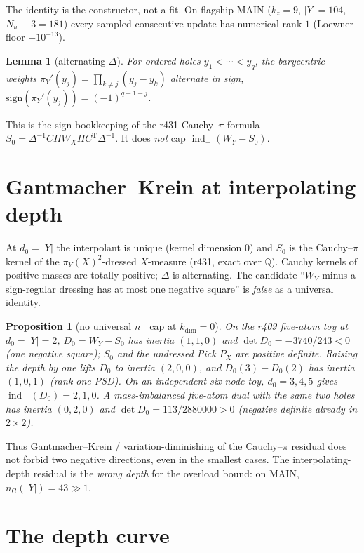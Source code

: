 \documentclass[11pt]{article}
\newtheorem{lemma}{Lemma}
\newtheorem{prop}{Proposition}
\theoremstyle{remark}
\newcommand{\indm}{\operatorname{ind}_{-}}
\newcommand{\nC}{n_{\mathrm{C}}}
\begin{document}
The identity is the constructor, not a fit.
On flagship MAIN ($k_z=9$, $|Y|=104$, $N_w-3=181$) every
sampled consecutive update has numerical rank $1$
(Loewner floor $-10^{-13}$).

\begin{lemma}[alternating $\Delta$]\label{lem:delta}
For ordered holes $y_1<\cdots<y_q$, the barycentric
weights $\pi_Y'(y_j)=\prod_{k\neq j}(y_j-y_k)$ alternate
in sign, $\mathrm{sign}(\pi_Y'(y_j))=(-1)^{q-1-j}$.
\end{lemma}

This is the sign bookkeeping of the r431 Cauchy--$\pi$
formula $S_0=\Delta^{-1}C\Pi W_X\Pi C^{\mathrm{T}}\Delta^{-1}$.
It does \emph{not} cap $\indm(W_Y-S_0)$.

\section{Gantmacher--Krein at interpolating depth}\label{sec:gk}

At $d_0=|Y|$ the interpolant is unique (kernel dimension
$0$) and $S_0$ is the Cauchy--$\pi$ kernel of the
$\pi_Y(X)^2$-dressed $X$-measure (r431, exact over
$\mathbb{Q}$).
Cauchy kernels of positive masses are totally positive;
$\Delta$ is alternating.
The candidate ``$W_Y$ minus a sign-regular dressing has
at most one negative square'' is \emph{false} as a
universal identity.

\begin{prop}[no universal $n_-$ cap at $k_{\mathrm{dim}}=0$]\label{prop:gk}
On the r409 five-atom toy at $d_0=|Y|=2$,
$D_0=W_Y-S_0$ has inertia $(1,1,0)$ and
$\det D_0=-3740/243<0$ (one negative square);
$S_0$ and the undressed Pick $P_X$ are positive definite.
Raising the depth by one lifts $D_0$ to inertia $(2,0,0)$,
and $D_0(3)-D_0(2)$ has inertia $(1,0,1)$ (rank-one PSD).
On an independent six-node toy, $d_0=3,4,5$ gives
$\indm(D_0)=2,1,0$.
A mass-imbalanced five-atom dual with the same two holes
has inertia $(0,2,0)$ and $\det D_0=113/2880000>0$
(negative definite already in $2\times 2$).
\end{prop}

Thus Gantmacher--Krein / variation-diminishing of the
Cauchy--$\pi$ residual does not forbid two negative
directions, even in the smallest cases.
The interpolating-depth residual is the \emph{wrong
depth} for the overload bound: on MAIN,
$\nC(|Y|)=43\gg 1$.

\section{The depth curve}\label{sec:curve}
\end{document}

